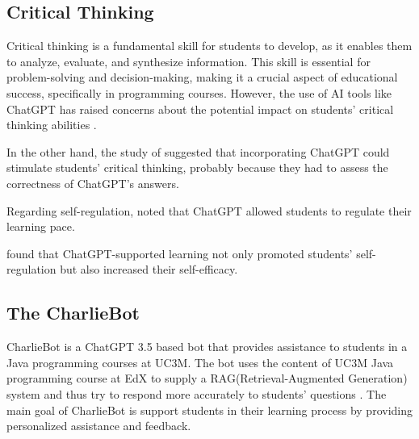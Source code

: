 \documentclass[conference]{IEEEtran}
\begin{document}
\subsection{Critical Thinking}

Critical thinking is a fundamental skill for students to develop, as it enables
them to analyze, evaluate, and synthesize information. This skill is essential
for problem-solving and decision-making, making it a crucial aspect of
educational success, specifically in programming courses. However, the use of AI
tools like ChatGPT has raised concerns about the potential impact on students'
critical thinking abilities \cite{Murillo23} \cite{cai23} \cite{chan23}.

In the other hand, the study of \cite{zhang24} suggested that incorporating
ChatGPT could stimulate students' critical thinking, probably because they
had to assess the correctness of ChatGPT's answers.

Regarding self-regulation, \cite{cai23} noted that ChatGPT allowed students to
regulate their learning pace.

\cite{wu24} found that ChatGPT-supported learning not only promoted students'
self-regulation but also increased their self-efficacy.

\subsection{The CharlieBot}

CharlieBot is a ChatGPT 3.5 based bot that provides assistance to students in a
Java programming courses at UC3M. The bot uses the content of UC3M Java
programming course at EdX to supply a RAG(Retrieval-Augmented Generation) system
and thus try to respond more accurately to students' questions \cite{Sun24}.
The main goal of CharlieBot is support students in their learning process by
providing personalized assistance and feedback.
\end{document}
